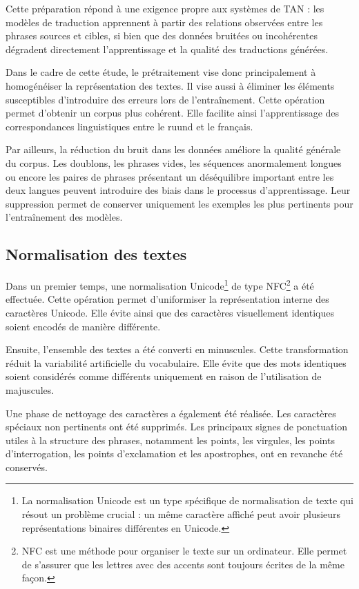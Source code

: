 Cette préparation répond à une exigence propre aux systèmes de \ac{TAN} : les modèles de traduction apprennent à partir des relations observées entre les phrases sources et cibles, si bien que des données bruitées ou incohérentes dégradent directement l'apprentissage et la qualité des traductions générées.

Dans le cadre de cette étude, le prétraitement vise donc principalement à homogénéiser la représentation des textes. Il vise aussi à éliminer les éléments susceptibles d'introduire des erreurs lors de l'entraînement. Cette opération permet d'obtenir un corpus plus cohérent. Elle facilite ainsi l'apprentissage des correspondances linguistiques entre le ruund et le français.

Par ailleurs, la réduction du bruit dans les données améliore la qualité générale du corpus. Les doublons, les phrases vides, les séquences anormalement longues ou encore les paires de phrases présentant un déséquilibre important entre les deux langues peuvent introduire des biais dans le processus d'apprentissage. Leur suppression permet de conserver uniquement les exemples les plus pertinents pour l'entraînement des modèles.

\subsection{Normalisation des textes}

Dans un premier temps, une normalisation Unicode\footnote{La normalisation Unicode est un type spécifique de normalisation de texte qui résout un problème crucial : un même caractère affiché peut avoir plusieurs représentations binaires différentes en Unicode.

} de type \ac{NFC}\footnote{\ac{NFC} est une méthode pour organiser le texte sur un ordinateur. Elle permet de s'assurer que les lettres avec des accents sont toujours écrites de la même façon.}  a été effectuée. Cette opération permet d'uniformiser la représentation interne des caractères Unicode. Elle évite ainsi que des caractères visuellement identiques soient encodés de manière différente.

Ensuite, l'ensemble des textes a été converti en minuscules. Cette transformation réduit la variabilité artificielle du vocabulaire. Elle évite que des mots identiques soient considérés comme différents uniquement en raison de l'utilisation de majuscules.

Une phase de nettoyage des caractères a également été réalisée. Les caractères spéciaux non pertinents ont été supprimés. Les principaux signes de ponctuation utiles à la structure des phrases, notamment les points, les virgules, les points d'interrogation, les points d'exclamation et les apostrophes, ont en revanche été conservés.

